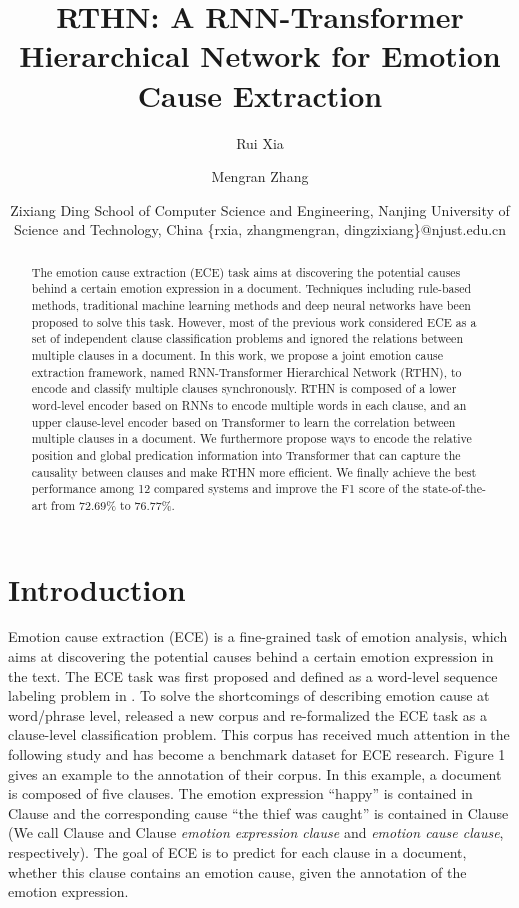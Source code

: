 \documentclass{article}
\title{RTHN: A RNN-Transformer Hierarchical Network for Emotion Cause Extraction}
\author{
Rui Xia\and
Mengran Zhang\and
Zixiang Ding
\affiliations
School of Computer Science and Engineering, 
\affiliations
Nanjing University of Science and Technology, China
\emails
\{rxia, zhangmengran, dingzixiang\}@njust.edu.cn
}
\begin{document}
\maketitle

\begin{abstract}
The emotion cause extraction (ECE) task aims at discovering the potential causes behind a certain emotion expression in a document. Techniques including rule-based methods, traditional machine learning methods and deep neural networks have been proposed to solve this task. However, most of the previous work considered ECE as a set of independent clause classification problems and ignored the relations between multiple clauses in a document. In this work, we propose a joint emotion cause extraction framework, named RNN-Transformer Hierarchical Network (RTHN), to encode and classify multiple clauses synchronously. RTHN is composed of a lower word-level encoder based on RNNs to encode multiple words in each clause, and an upper clause-level encoder based on Transformer to learn the correlation between multiple clauses in a document. We furthermore propose ways to encode the relative position and global predication information into Transformer that can capture the causality between clauses and make RTHN more efficient. We finally
achieve the best performance among 12 compared systems and improve the F1 score of the state-of-the-art from 72.69\% to 76.77\%.
\end{abstract}

\section{Introduction}
Emotion cause extraction (ECE) is a fine-grained task of emotion analysis, which aims at discovering the potential causes behind a certain emotion expression in the text. The ECE task was first proposed and defined as a word-level sequence labeling problem in \cite{lee2010text}. To solve the shortcomings of describing emotion cause at word/phrase level, \cite{gui2016event} released a new corpus and re-formalized the ECE task as a clause-level classification problem. This corpus has received much attention in the following study and has become a benchmark dataset for ECE research. Figure 1 gives an example to the annotation of their corpus. In this example, a document is composed of five clauses. The emotion expression “happy” is contained in Clause  and the corresponding cause “the thief was caught” is contained in Clause  (We call Clause  and Clause  \emph{emotion expression clause} and \emph{emotion cause clause}, respectively). The goal of ECE is to predict for each clause in a document, whether this clause contains an emotion cause, given the annotation of the emotion expression.
\end{document}
